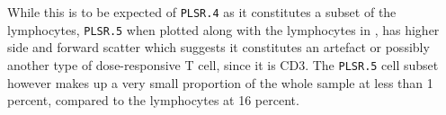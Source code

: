 While this is to be expected of \texttt{PLSR.4} as it constitutes a subset of the lymphocytes, \texttt{PLSR.5} when plotted along with the lymphocytes in , has higher side and forward scatter which suggests it constitutes an artefact or possibly another type of dose-responsive T cell, since it is CD3\positive.
The \texttt{PLSR.5} cell subset however makes up a very small proportion of the whole sample at less than 1 percent, compared to the lymphocytes at 16 percent.  

%
